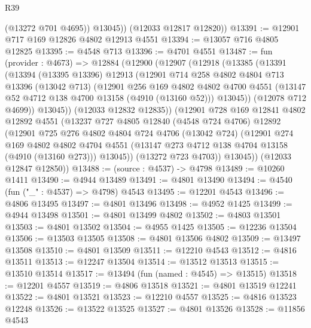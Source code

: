 \begin{lexlean}{R39}
\begin{coremodule}
            (@13272 @701 @4695))
          @13045))
      (@12033 @12817 @12820))
@13391 := @12901 @717 @169 @12826 @4802 @12913 @4551
@13394 := @13057 @716 @4805 @12825
@13395 := @4548 @713
@13396 := @4701 @4551
@13487 := fun (provider : @4673) =>
  @12884
    (@12900
      (@12907
        (@12918
          (@13385
            (@13391
              (@13394
                (@13395 @13396)
                @12913
                (@12901
                  @714
                  @258
                  @4802
                  @4804
                  @713
                  @13396
                  (@13042 @713)
                  (@12901
                    @256
                    @169
                    @4802
                    @4802
                    @4700
                    @4551
                    (@13147 @52 @4712 @138 @4700 @13158 (@4910 (@13160 @52)))
                    @13045))
                (@12078 @712 @4699))
              @13045))
          (@12033 @12832 @12835))
        (@12901
          @728
          @169
          @12841
          @4802
          @12892
          @4551
          (@13237
            @727
            @4805
            @12840
            (@4548 @724 @4706)
            @12892
            (@12901
              @725
              @276
              @4802
              @4804
              @724
              @4706
              (@13042 @724)
              (@12901
                @274
                @169
                @4802
                @4802
                @4704
                @4551
                (@13147 @273 @4712 @138 @4704 @13158 (@4910 (@13160 @273)))
                @13045))
            (@13272 @723 @4703))
          @13045))
      (@12033 @12847 @12850))
@13488 := (source : @4537) -> @4798
@13489 := @10260 @1411
@13490 := @4944 @13489
@13491 := @4801 @13490
@13494 := @4540 (fun ("_" : @4537) => @4798) @4543
@13495 := @12201 @4543
@13496 := @4806 @13495
@13497 := @4801 @13496
@13498 := @4952 @1425
@13499 := @4944 @13498
@13501 := @4801 @13499 @4802
@13502 := @4803 @13501
@13503 := @4801 @13502
@13504 := @4955 @1425
@13505 := @12236 @13504
@13506 := @13503 @13505
@13508 := @4801 @13506 @4802
@13509 := @13497 @13508
@13510 := @4801 @13509
@13511 := @12210 @4543
@13512 := @4816 @13511
@13513 := @12247 @13504
@13514 := @13512 @13513
@13515 := @13510 @13514
@13517 := @13494 (fun (named : @4545) => @13515)
@13518 := @12201 @4557
@13519 := @4806 @13518
@13521 := @4801 @13519 @12241
@13522 := @4801 @13521
@13523 := @12210 @4557
@13525 := @4816 @13523 @12248
@13526 := @13522 @13525
@13527 := @4801 @13526
@13528 := @11856 @4543

\end{coremodule}
\end{lexlean}
